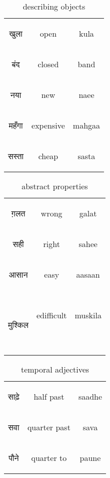 \begin{table}[H]
    \centering
    \begin{tabular}{c|c|c}
        \begin{hindi} खुला \end{hindi} & open & kula \\
        \begin{hindi} बंद \end{hindi} & closed & band \\
        \begin{hindi} नया \end{hindi} & new & naee \\
        \begin{hindi} महँगा \end{hindi} & expensive & mahgaa \\
        \begin{hindi} सस्ता \end{hindi} & cheap & sasta \\
    \end{tabular}
    \caption{describing objects}
    \label{tab:adjectives_object_describing}
\end{table}

\begin{table}[H]
    \centering
    \begin{tabular}{c|c|c}
        \begin{hindi} ग़लत \end{hindi} & wrong & galat \\
        \begin{hindi} सही \end{hindi} & right & sahee \\
        \begin{hindi} आसान \end{hindi} &  easy & aasaan \\\
        \begin{hindi}मुश्किल \end{hindi} &  edifficult & muskila \\\
    \end{tabular}
    \caption{abstract properties}
    \label{tab:adjectives_abstract}
\end{table}

\begin{table}[H]
    \centering
    \begin{tabular}{c|c|c}
        \begin{hindi} साढ़े \end{hindi} & half past  & saadhe \\
        \begin{hindi} सवा \end{hindi} & quarter past  & sava \\
        \begin{hindi} पौने \end{hindi} & quarter to  & paune \\
    \end{tabular}
    \caption{temporal adjectives}
    \label{tab:adjectives_temporal}
\end{table}


